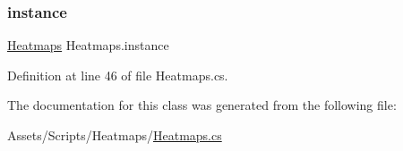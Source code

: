 \subsubsection{\texorpdfstring{instance}{instance}}
{\footnotesize\ttfamily \mbox{\hyperlink{class_heatmaps}{Heatmaps}} Heatmaps.\+instance\hspace{0.3cm}{\ttfamily [static]}}



Definition at line 46 of file Heatmaps.\+cs.



The documentation for this class was generated from the following file\+:\begin{DoxyCompactItemize}
\item 
Assets/\+Scripts/\+Heatmaps/\mbox{\hyperlink{_heatmaps_8cs}{Heatmaps.\+cs}}\end{DoxyCompactItemize}
